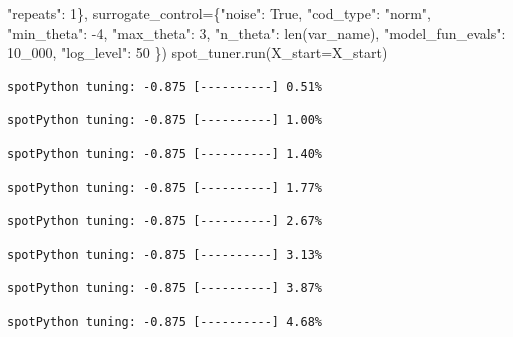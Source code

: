 \documentclass[
  letterpaper,
  DIV=11,
  numbers=noendperiod]{scrreprt}
\newenvironment{Shaded}{\begin{snugshade}}{\end{snugshade}}
\newcommand{\BuiltInTok}[1]{\textcolor[rgb]{0.00,0.23,0.31}{#1}}
\newcommand{\DecValTok}[1]{\textcolor[rgb]{0.68,0.00,0.00}{#1}}
\newcommand{\NormalTok}[1]{\textcolor[rgb]{0.00,0.23,0.31}{#1}}
\newcommand{\OperatorTok}[1]{\textcolor[rgb]{0.37,0.37,0.37}{#1}}
\newcommand{\StringTok}[1]{\textcolor[rgb]{0.13,0.47,0.30}{#1}}
\newcommand{\VariableTok}[1]{\textcolor[rgb]{0.07,0.07,0.07}{#1}}
\begin{document}
\begin{Shaded}
\begin{Highlighting}[]
                                   \StringTok{"repeats"}\NormalTok{: }\DecValTok{1}\NormalTok{\},}
\NormalTok{                   surrogate\_control}\OperatorTok{=}\NormalTok{\{}\StringTok{"noise"}\NormalTok{: }\VariableTok{True}\NormalTok{,}
                                      \StringTok{"cod\_type"}\NormalTok{: }\StringTok{"norm"}\NormalTok{,}
                                      \StringTok{"min\_theta"}\NormalTok{: }\OperatorTok{{-}}\DecValTok{4}\NormalTok{,}
                                      \StringTok{"max\_theta"}\NormalTok{: }\DecValTok{3}\NormalTok{,}
                                      \StringTok{"n\_theta"}\NormalTok{: }\BuiltInTok{len}\NormalTok{(var\_name),}
                                      \StringTok{"model\_fun\_evals"}\NormalTok{: }\DecValTok{10\_000}\NormalTok{,}
                                      \StringTok{"log\_level"}\NormalTok{: }\DecValTok{50}
\NormalTok{                                      \})}
\NormalTok{spot\_tuner.run(X\_start}\OperatorTok{=}\NormalTok{X\_start)}
\end{Highlighting}
\end{Shaded}

\begin{verbatim}
spotPython tuning: -0.875 [----------] 0.51% 
\end{verbatim}

\begin{verbatim}
spotPython tuning: -0.875 [----------] 1.00% 
\end{verbatim}

\begin{verbatim}
spotPython tuning: -0.875 [----------] 1.40% 
\end{verbatim}

\begin{verbatim}
spotPython tuning: -0.875 [----------] 1.77% 
\end{verbatim}

\begin{verbatim}
spotPython tuning: -0.875 [----------] 2.67% 
\end{verbatim}

\begin{verbatim}
spotPython tuning: -0.875 [----------] 3.13% 
\end{verbatim}

\begin{verbatim}
spotPython tuning: -0.875 [----------] 3.87% 
\end{verbatim}

\begin{verbatim}
spotPython tuning: -0.875 [----------] 4.68% 
\end{verbatim}
\end{document}
